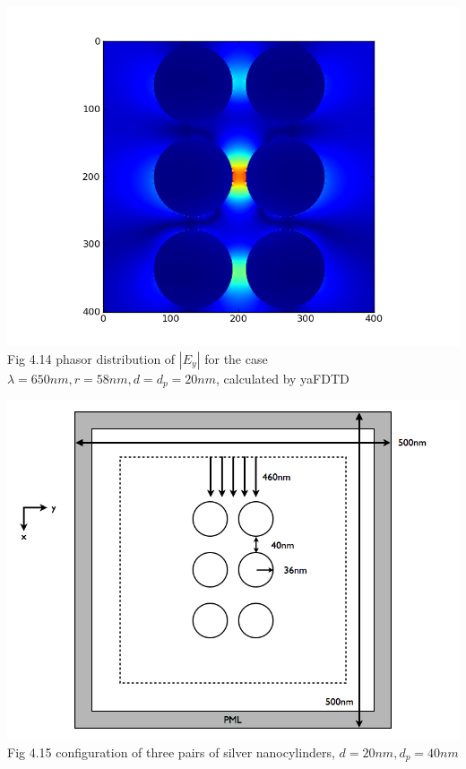 \documentclass[openany]{book}
\begin{document}
\begin{center}
\includegraphics[scale=0.8]{images/ey-r58.png}\\
Fig 4.14
phasor distribution of $|E_y|$ for the case $\lambda = 650nm, r = 58nm, d = d_p = 20nm$, calculated by yaFDTD
\end{center}


\begin{center}
\includegraphics[scale=0.5]{images/open-cavity-config-d40.png}\\
Fig 4.15
configuration of three pairs of silver nanocylinders, $d = 20nm, d_p = 40nm$
\end{center}
\end{document}
